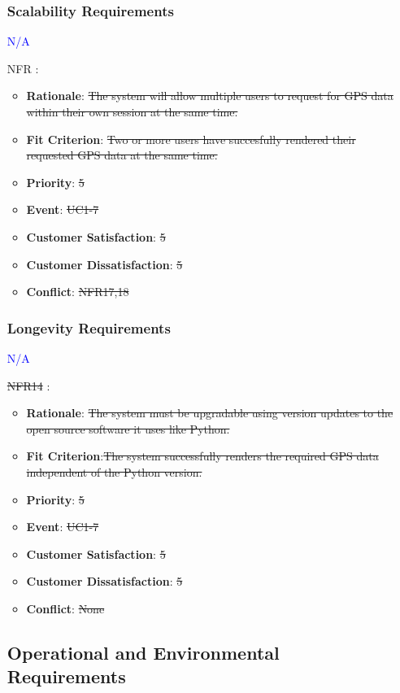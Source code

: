 \documentclass[12pt, titlepage]{article}
\newcounter{reqnum} %
\newcounter{freqnum} %
\begin{document}
\begin{itemize}
\subsubsection{Scalability Requirements}
\textcolor{blue}{N/A}
\item[NFR\refstepcounter{freqnum}\thefreqnum
\label{NFR}:] 
\begin{itemize}
    \item \textbf{Rationale}: \sout{The system will allow multiple users to request for GPS data within their own session at the same time.}
    \item \textbf{Fit Criterion}: \sout{Two or more users have succesfully rendered their requested GPS data at the same time.}
    \item \textbf{Priority}: \sout{5}
    \item \textbf{Event}: \sout{UC1-7}%
    \item \textbf{Customer Satisfaction}: \sout{5}
    \item \textbf{Customer Dissatisfaction}: \sout{5}
    \item \textbf{Conflict}: \sout{NFR17,18}
\end{itemize}
\subsubsection{Longevity Requirements}
\textcolor{blue}{N/A}
\item[\sout{NFR14}
\label{NFR}:] 
\begin{itemize}
    \item \textbf{Rationale}: \sout{The system must be upgradable using version updates to the open source software it uses like Python.}
    \item \textbf{Fit Criterion}:\sout{The system successfully renders the required GPS data independent of the Python version.}
    \item \textbf{Priority}: \sout{5}
    \item \textbf{Event}: \sout{UC1-7}%
    \item \textbf{Customer Satisfaction}: \sout{5}
    \item \textbf{Customer Dissatisfaction}: \sout{5}
    \item \textbf{Conflict}: \sout{None}
\end{itemize}
\subsection{Operational and Environmental Requirements}


\end{itemize}
\end{document}
